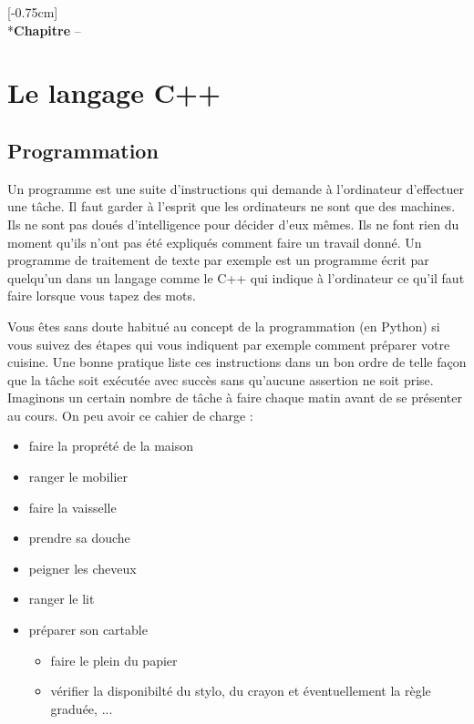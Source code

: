\documentclass[a4paper, oneside,11pt]{book}
\begin{document}
\vspace*{0.40cm}
\sloppy

\mainmatter



[-0.75cm]{}
{\\*{\textbf{Chapitre} \textbf{\thecontentslabel}} -- }
{}
{\dotfill \contentspage}

\chapter{Le langage C++}

\pagestyle{fancy}
\renewcommand{\chaptermark}[1]{\markboth{#1}{}}
 \rhead{\thepage}
\vspace{-0.75cm}
\section{Programmation}

Un programme est une suite d'instructions qui demande \`a l'ordinateur d'effectuer une t\^ache. Il faut  garder \`a l'esprit que les ordinateurs ne sont que des machines. Ils ne 
sont pas dou\'es d'intelligence pour d\'ecider d'eux m\^emes. Ils ne font rien du moment qu'ils n'ont pas \'et\'e expliqu\'es comment faire un travail donn\'e. 
Un programme de traitement de
texte par exemple est un programme \'ecrit par quelqu'un dans un langage comme le C++ qui indique \`a l'ordinateur ce qu'il faut faire lorsque vous tapez des mots.


Vous \^etes sans doute habitu\'e au concept de la programmation (en Python) si vous suivez des \'etapes qui vous indiquent par exemple comment pr\'eparer votre cuisine. 
Une bonne pratique liste ces instructions dans un bon ordre de telle fa\c{c}on que la t\^ache soit ex\'ecut\'ee avec succ\`es sans qu'aucune assertion ne soit prise. Imaginons 
un certain nombre de t\^ache \`a faire chaque matin avant de se pr\'esenter au cours. On peu avoir ce cahier de charge : 

\begin{itemize}
\item faire la propr\'et\'e de la maison
\item ranger le mobilier
\item faire la vaisselle
\item prendre sa douche
\item peigner les cheveux
\item ranger le lit
\item pr\'eparer son cartable
\begin{itemize}
\item faire le plein du papier
\item v\'erifier la disponibilt\'e du stylo, du crayon et \'eventuellement la r\`egle gradu\'ee, ...
\end{itemize}
\end{itemize} 
\end{document}
